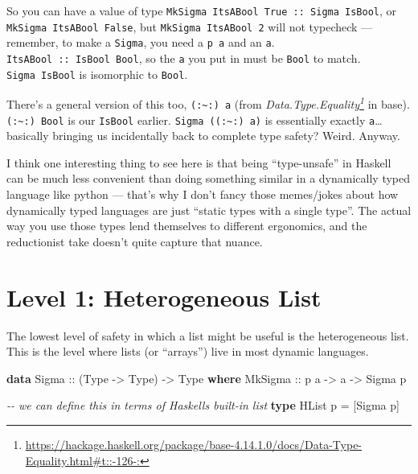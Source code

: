 \documentclass[]{article}
\newenvironment{Shaded}{}{}
\newcommand{\CommentTok}[1]{\textcolor[rgb]{0.38,0.63,0.69}{\textit{#1}}}
\newcommand{\DataTypeTok}[1]{\textcolor[rgb]{0.56,0.13,0.00}{#1}}
\newcommand{\KeywordTok}[1]{\textcolor[rgb]{0.00,0.44,0.13}{\textbf{#1}}}
\newcommand{\NormalTok}[1]{#1}
\newcommand{\OtherTok}[1]{\textcolor[rgb]{0.00,0.44,0.13}{#1}}
\renewcommand{\href}[2]{#2\footnote{\url{#1}}}
\begin{document}
So you can have a value of type
\texttt{MkSigma\ ItsABool\ True\ ::\ Sigma\ IsBool}, or
\texttt{MkSigma\ ItsABool\ False}, but \texttt{MkSigma\ ItsABool\ 2} will not
typecheck --- remember, to make a \texttt{Sigma}, you need a \texttt{p\ a} and
an \texttt{a}. \texttt{ItsABool\ ::\ IsBool\ Bool}, so the \texttt{a} you put in
must be \texttt{Bool} to match. \texttt{Sigma\ IsBool} is isomorphic to
\texttt{Bool}.

There's a general version of this too, \texttt{(:\textasciitilde{}:)\ a} (from
\emph{\href{https://hackage.haskell.org/package/base-4.14.1.0/docs/Data-Type-Equality.html\#t::-126-:}{Data.Type.Equality}}
in base). \texttt{(:\textasciitilde{}:)\ Bool} is our \texttt{IsBool} earlier.
\texttt{Sigma\ ((:\textasciitilde{}:)\ a)} is essentially exactly
\texttt{a}\ldots basically bringing us incidentally back to complete type
safety? Weird. Anyway.

I think one interesting thing to see here is that being ``type-unsafe'' in
Haskell can be much less convenient than doing something similar in a
dynamically typed language like python --- that's why I don't fancy those
memes/jokes about how dynamically typed languages are just ``static types with a
single type''. The actual way you use those types lend themselves to different
ergonomics, and the reductionist take doesn't quite capture that nuance.

\hypertarget{level-1-heterogeneous-list}{%
\section{Level 1: Heterogeneous List}\label{level-1-heterogeneous-list}}

The lowest level of safety in which a list might be useful is the heterogeneous
list. This is the level where lists (or ``arrays'') live in most dynamic
languages.

\begin{Shaded}
\begin{Highlighting}[]
\KeywordTok{data} \DataTypeTok{Sigma}\OtherTok{ ::}\NormalTok{ (}\DataTypeTok{Type} \OtherTok{{-}>} \DataTypeTok{Type}\NormalTok{) }\OtherTok{{-}>} \DataTypeTok{Type} \KeywordTok{where}
    \DataTypeTok{MkSigma}\OtherTok{ ::}\NormalTok{ p a }\OtherTok{{-}>}\NormalTok{ a }\OtherTok{{-}>} \DataTypeTok{Sigma}\NormalTok{ p}

\CommentTok{{-}{-} we can define this in terms of Haskell\textquotesingle{}s built{-}in list}
\KeywordTok{type} \DataTypeTok{HList}\NormalTok{ p }\OtherTok{=}\NormalTok{ [}\DataTypeTok{Sigma}\NormalTok{ p]}
\end{Highlighting}
\end{Shaded}
\end{document}
